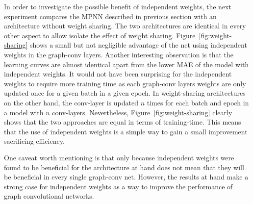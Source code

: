 In order to investigate the possible benefit of independent weights, the next experiment compares the MPNN described in previous section with an architecture without weight sharing. The two architectures are identical in every other aspect to allow isolate the effect of weight sharing. Figure~\ref{fig:weight-sharing} shows a small but not negligible advantage of the net using independent weights in the graph-conv layers. Another interesting observation is that the learning curves are almost identical apart from the lower MAE of the model with independent weights. It would not have been surprising for the independent weights to require more training time as each graph-conv layers weights are only updated once for a given batch in a given epoch. In weight-sharing architectures on the other hand, the conv-layer is updated $n$ times for each batch and epoch in a model with $n$ conv-layers. Nevertheless, Figure~\ref{fig:weight-sharing} clearly shows that the two approaches are equal in terms of training-time. This means that the use of independent weights is a simple way to gain a small improvement sacrificing efficiency.

One caveat worth mentioning is that only because independent weights were found to be beneficial for the architecture at hand does not mean that they will be beneficial in every single graph-conv net. However, the results at hand make a strong case for independent weights as a way to improve the performance of graph convolutional networks. 



